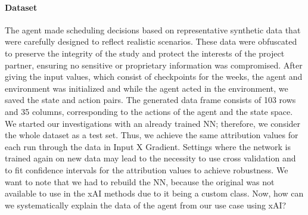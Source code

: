 \paragraph{Dataset}
The agent made scheduling decisions based on representative synthetic data that were carefully designed to reflect realistic scenarios. These data were obfuscated to preserve the integrity of the study and protect the interests of the project partner, ensuring no sensitive or proprietary information was compromised. After giving the input values, which consist of checkpoints for the weeks, the agent and environment was initialized and while the agent acted in the environment, we saved the state and action pairs. The generated data frame consists of 103 rows and 35 columns, corresponding to the actions of the agent and the state space.
We started our investigations with an already trained NN; therefore, we consider the whole dataset as a test set. Thus, we achieve the same attribution values for each run through the data in Input X Gradient. Settings where the network is trained again on new data may lead to the necessity to use cross validation and to fit confidence intervals for the attribution values to achieve robustness.
We want to note that we had to rebuild the NN, because the original was not available to use in the xAI methods due to it being a custom class.
Now, how can we systematically explain the data of the agent from our use case using xAI?

